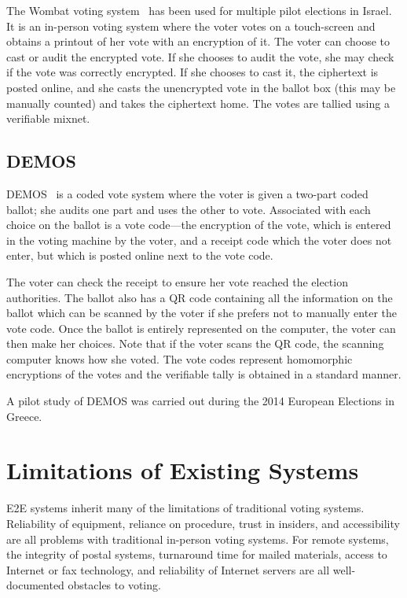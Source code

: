 The Wombat voting system~\cite{rosen2011} has been used for multiple
pilot elections in Israel. It is an in-person voting system where the
voter votes on a touch-screen and obtains a printout of her vote with
an encryption of it. The voter can choose to cast or audit the
encrypted vote. If she chooses to audit the vote, she may check if the
vote was correctly encrypted. If she chooses to cast it, the
ciphertext is posted online, and she casts the unencrypted vote in the
ballot box (this may be manually counted) and takes the ciphertext
home. The votes are tallied using a verifiable mixnet.

\subsection{DEMOS}

DEMOS~\cite{kiayias2014} is a coded vote system where the voter is
given a two-part coded ballot; she audits one part and uses the other
to vote. Associated with each choice on the ballot is a vote
code---the encryption of the vote, which is entered in the voting
machine by the voter, and a receipt code which the voter does not
enter, but which is posted online next to the vote code.

The voter can check the receipt to ensure her vote reached the
election authorities. The ballot also has a QR code containing all the
information on the ballot which can be scanned by the voter if she
prefers not to manually enter the vote code. Once the ballot is
entirely represented on the computer, the voter can then make her
choices. Note that if the voter scans the QR code, the scanning
computer knows how she voted. The vote codes represent homomorphic
encryptions of the votes and the verifiable tally is obtained in a
standard manner.

A pilot study of DEMOS was carried out during the 2014 European
Elections in Greece.

\section{Limitations of Existing Systems}
\label{sec:limit-exist-syst}

E2E systems inherit many of the limitations of traditional voting
systems. Reliability of equipment, reliance on procedure, trust in
insiders, and accessibility are all problems with traditional
in-person voting systems. For remote systems, the integrity of postal
systems, turnaround time for mailed materials, access to Internet or
fax technology, and reliability of Internet servers are all
well-documented obstacles to voting. 

